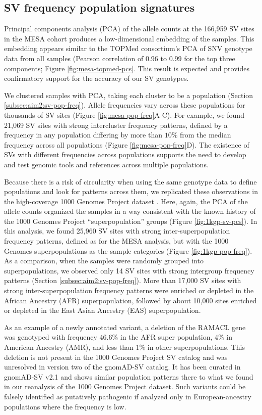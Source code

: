 \documentclass[11pt]{ucscthesis}
\begin{document}
\subsection{SV frequency population signatures}
\label{subsec:aim2:inter-super-pop}
Principal components analysis (PCA) of the allele counts at the 166,959 SV sites in the MESA cohort produces a low-dimensional embedding of the samples.
This embedding appears similar to the TOPMed consortium’s PCA of SNV genotype data from all samples (Pearson correlation of 0.96 to 0.99 for the top three components; Figure \ref{fig:mesa-topmed-pcs}.
This result is expected and provides confirmatory support for the accuracy of our SV genotypes.

We clustered samples with PCA, taking each cluster to be a population (Section \ref{subsec:aim2:sv-pop-freq}).
Allele frequencies vary across these populations for thousands of SV sites (Figure \ref{fig:mesa-pop-freq}A-C).
For example, we found 21,069 SV sites with strong intercluster frequency patterns, defined by a frequency in any population differing by more than $10\%$ from the median frequency across all populations (Figure \ref{fig:mesa-pop-freq}D).
The existence of SVs with different frequencies across populations supports the need to develop and test genomic tools and references across multiple populations.

Because there is a risk of circularity when using the same genotype data to define populations and look for patterns across them, we replicated these observations in the high-coverage 1000 Genomes Project dataset \cite{1000gp_nygc_2021}.
Here, again, the PCA of the allele counts organized the samples in a way consistent with the known history of the 1000 Genomes Project “superpopulation” groups (Figure \ref{fig:1kgp-sv-pcs}).
In this analysis, we found 25,960 SV sites with strong inter-superpopulation frequency patterns, defined as for the MESA analysis, but with the 1000 Genomes superpopulations as the sample categories (Figure \ref{fig:1kgp-pop-freq}).
As a comparison, when the samples were randomly grouped into superpopulations, we observed only 14 SV sites with strong intergroup frequency patterns (Section \ref{subsec:aim2:sv-pop-freq}).
More than 17,000 SV sites with strong inter-superpopulation frequency patterns were enriched or depleted in the African Ancestry (AFR) superpopulation, followed by about 10,000 sites enriched or depleted in the East Asian Ancestry (EAS) superpopulation.

As an example of a newly annotated variant, a deletion of the RAMACL gene was genotyped with frequency $46.6\%$ in the AFR super population, $4\%$ in American Ancestry (AMR), and less than $1\%$ in other superpopulations.
This deletion is not present in the 1000 Genomes Project SV catalog and was unresolved in version two of the gnomAD-SV catalog.
It has been curated in gnomAD-SV v2.1 and shows similar population patterns there to what we found in our reanalysis of the 1000 Genomes Project dataset.
Such variants could be falsely identified as putatively pathogenic if analyzed only in European-ancestry populations where the frequency is low.
\end{document}

